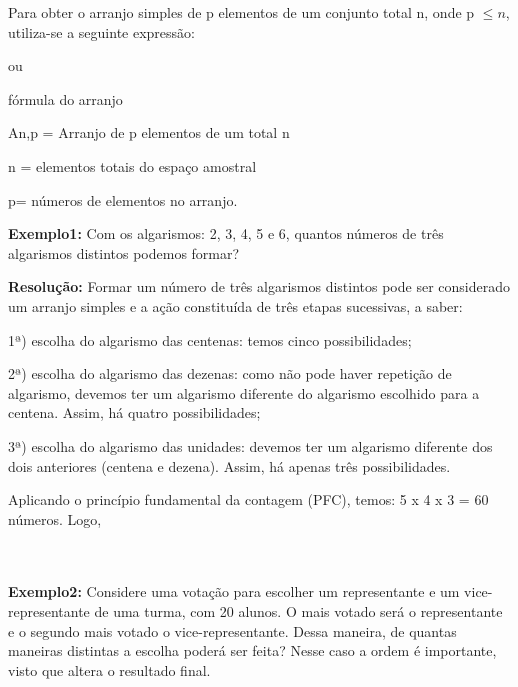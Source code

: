 \begin{multicols*}{2}
Para obter o arranjo simples de p elementos de um conjunto total  n, onde p $\leq n$, utiliza-se a seguinte expressão:

 ou 

fórmula do arranjo

An,p = Arranjo de p elementos de um total n

n = elementos totais do espaço amostral

p= números de elementos no arranjo.

\textbf{Exemplo1:} Com os algarismos: 2, 3, 4, 5 e 6, quantos números de três algarismos distintos podemos formar?

\textbf{Resolução:} Formar um número de três algarismos distintos pode ser considerado um arranjo simples e a ação constituída de três etapas sucessivas, a saber:

1ª) escolha do algarismo das centenas: temos cinco possibilidades;

2ª) escolha do algarismo das dezenas: como não pode haver repetição de algarismo, devemos ter um algarismo diferente do algarismo escolhido para a centena. Assim, há quatro possibilidades;

3ª) escolha do algarismo das unidades: devemos ter um algarismo diferente dos dois anteriores (centena e dezena). Assim, há apenas três possibilidades.

Aplicando o princípio fundamental da contagem (PFC), temos: 5 x 4 x 3 = 60 números. Logo,

\\

\\

\textbf{Exemplo2: } Considere uma votação para escolher um representante e um vice-representante de uma turma, com 20 alunos. O mais votado será o representante e o segundo mais votado o vice-representante. Dessa maneira, de quantas maneiras distintas a escolha poderá ser feita? Nesse caso a ordem é importante, visto que altera o resultado final.


\\


\end{multicols*}
